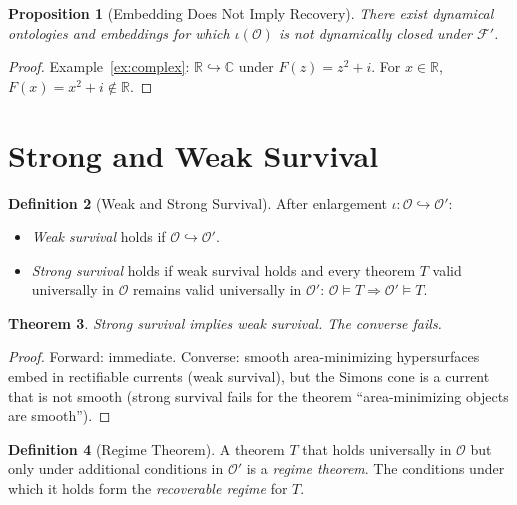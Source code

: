 \documentclass[12pt,oneside]{book}
\theoremstyle{plain}
\newtheorem{theorem}{Theorem}[chapter]
\newtheorem{proposition}[theorem]{Proposition}
\theoremstyle{definition}
\newtheorem{definition}[theorem]{Definition}
\theoremstyle{remark}
\newcommand{\Oold}{\mathcal{O}}
\newcommand{\Onew}{\mathcal{O}'}
\newcommand{\F}{\mathcal{F}}
\newcommand{\Real}{\mathbb{R}}
\begin{document}
\begin{proposition}[Embedding Does Not Imply Recovery]
\label{prop:embedding-not-recovery}
There exist dynamical ontologies and embeddings for which $\iota(\Oold)$
is not dynamically closed under $\F'$.
\end{proposition}

\begin{proof}
Example~\ref{ex:complex}: $\Real \hookrightarrow \mathbb{C}$ under
$F(z) = z^2 + i$. For $x \in \Real$, $F(x) = x^2 + i \notin \Real$.
\end{proof}

\section{Strong and Weak Survival}

\begin{definition}[Weak and Strong Survival]
After enlargement $\iota : \Oold \hookrightarrow \Onew$:
\begin{itemize}
\item \emph{Weak survival} holds if $\Oold \hookrightarrow \Onew$.
\item \emph{Strong survival} holds if weak survival holds and every theorem
      $T$ valid universally in $\Oold$ remains valid universally in $\Onew$:
      $\Oold \models T \Rightarrow \Onew \models T$.
\end{itemize}
\end{definition}

\begin{theorem}
Strong survival implies weak survival. The converse fails.
\end{theorem}

\begin{proof}
Forward: immediate. Converse: smooth area-minimizing hypersurfaces embed in
rectifiable currents (weak survival), but the Simons cone is a current that
is not smooth (strong survival fails for the theorem ``area-minimizing objects
are smooth'').
\end{proof}

\begin{definition}[Regime Theorem]
A theorem $T$ that holds universally in $\Oold$ but only under additional
conditions in $\Onew$ is a \emph{regime theorem}. The conditions under which
it holds form the \emph{recoverable regime} for $T$.
\end{definition}
\end{document}

